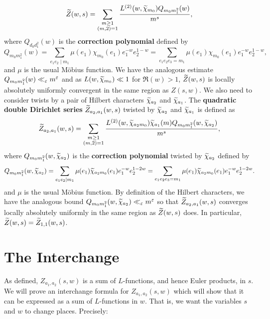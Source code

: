     \[
        \widetilde{Z}(w,s) = \sum_{\substack{m \ge 1 \\ (m,2) = 1}}\frac{L^{(2)}(w,\widetilde{\chi}_{m_{0}})Q_{m_{0}m_{1}^{2}}(w)}{m^{s}},
    \]
    where $Q_{d_{0}d_{1}^{2}}(w)$ is the \textbf{correction polynomial} defined by
    \[
        Q_{m_{0}m_{1}^{2}}(w) = \sum_{e_{1}e_{2} \mid m_{1}}\mu(e_{1})\chi_{m_{0}}(e_{1})e_{1}^{-w}e_{2}^{1-w} = \sum_{e_{1}e_{2}e_{3} = m_{1}}\mu(e_{1})\chi_{m_{0}}(e_{1})e_{1}^{-w}e_{2}^{1-w},
    \]
    and $\mu$ is the usual M\"obius function. We have the analogous estimate $Q_{m_{0}m_{1}^{2}}(w) \ll_{\varepsilon} m^{\varepsilon}$ and as $L(w,\widetilde{\chi}_{m_{0}}) \ll 1$ for $\Re(w) > 1$, $\widetilde{Z}(w,s)$ is locally absolutely uniformly convergent in the same region as $Z(s,w)$. We also need to consider twists by a pair of Hilbert characters $\widetilde{\chi}_{a_{2}}$ and $\widetilde{\chi}_{a_{1}}$. The \textbf{quadratic double Dirichlet series} $\widetilde{Z}_{a_{2},a_{1}}(w,s)$ twisted by $\widetilde{\chi}_{a_{2}}$ and $\widetilde{\chi}_{a_{1}}$ is defined as
    \[
        \widetilde{Z}_{a_{2},a_{1}}(w,s) = \sum_{\substack{m \ge 1 \\ (m,2) = 1}}\frac{L^{(2)}(w,\widetilde{\chi}_{a_{2}m_{0}})\widetilde{\chi}_{a_{1}}(m)Q_{m_{0}m_{1}^{2}}(w,\widetilde{\chi}_{a_{2}})}{m^{s}},
    \]
    where $Q_{m_{0}m_{1}^{2}}(w,\widetilde{\chi}_{a_{2}})$ is the \textbf{correction polynomial} twisted by $\widetilde{\chi}_{a_{2}}$ defined by
    \[
        Q_{m_{0}m_{1}^{2}}(w,\widetilde{\chi}_{a_{2}}) = \sum_{e_{1}e_{2} \mid m_{1}}\mu(e_{1})\widetilde{\chi}_{a_{2}m_{0}}(e_{1})e_{1}^{-w}e_{2}^{1-2w} = \sum_{e_{1}e_{2}e_{3} = m_{1}}\mu(e_{1})\widetilde{\chi}_{a_{2}m_{0}}(e_{1})e_{1}^{-w}e_{2}^{1-2w}.
    \]
    and $\mu$ is the usual M\"obius function. By definition of the Hilbert characters, we have the analogous bound $Q_{m_{0}m_{1}^{2}}(w,\widetilde{\chi}_{a_{2}}) \ll_{\varepsilon} m^{\varepsilon}$ so that $\widetilde{Z}_{a_{2},a_{1}}(w,s)$ converges locally absolutely uniformly in the same region as $\widetilde{Z}(w,s)$ does. In particular, $\widetilde{Z}(w,s) = \widetilde{Z}_{1,1}(w,s)$.
\section{The Interchange}
    As defined, $Z_{a_{1},a_{2}}(s,w)$ is a sum of $L$-functions, and hence Euler products, in $s$. We will prove an interchange formula for $Z_{a_{1},a_{2}}(s,w)$ which will show that it can be expressed as a sum of $L$-functions in $w$. That is, we want the variables $s$ and $w$ to change places. Precisely:

